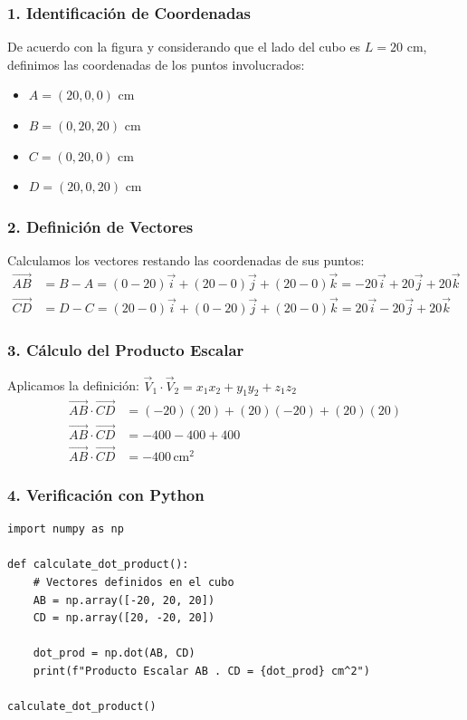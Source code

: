 \documentclass[12pt, a4paper]{article}
\begin{document}
\subsubsection*{1. Identificación de Coordenadas}
De acuerdo con la figura y considerando que el lado del cubo es $L = 20$ cm, definimos las coordenadas de los puntos involucrados:
\begin{itemize}
    \item $A = (20, 0, 0)$ cm
    \item $B = (0, 20, 20)$ cm
    \item $C = (0, 20, 0)$ cm
    \item $D = (20, 0, 20)$ cm
\end{itemize}

\subsubsection*{2. Definición de Vectores}
Calculamos los vectores restando las coordenadas de sus puntos:
\begin{align*}
    \vec{AB} &= B - A = (0-20)\vec{i} + (20-0)\vec{j} + (20-0)\vec{k} = -20\vec{i} + 20\vec{j} + 20\vec{k} \\
    \vec{CD} &= D - C = (20-0)\vec{i} + (0-20)\vec{j} + (20-0)\vec{k} = 20\vec{i} - 20\vec{j} + 20\vec{k}
\end{align*}

\subsubsection*{3. Cálculo del Producto Escalar}
Aplicamos la definición: $\vec{V}_1 \cdot \vec{V}_2 = x_1x_2 + y_1y_2 + z_1z_2$
\begin{align*}
    \vec{AB} \cdot \vec{CD} &= (-20)(20) + (20)(-20) + (20)(20) \\
    \vec{AB} \cdot \vec{CD} &= -400 - 400 + 400 \\
    \vec{AB} \cdot \vec{CD} &= -400 \, \text{cm}^2
\end{align*}

\subsubsection*{4. Verificación con Python}
\begin{lstlisting}
import numpy as np

def calculate_dot_product():
    # Vectores definidos en el cubo
    AB = np.array([-20, 20, 20])
    CD = np.array([20, -20, 20])
    
    dot_prod = np.dot(AB, CD)
    print(f"Producto Escalar AB . CD = {dot_prod} cm^2")

calculate_dot_product()
\end{lstlisting}
\end{document}
